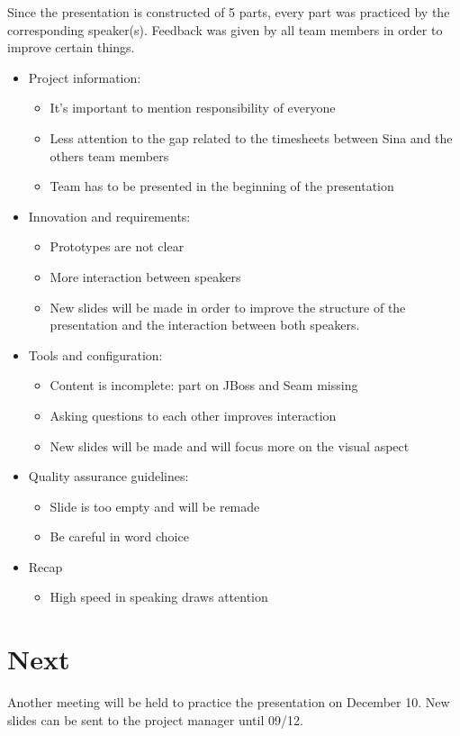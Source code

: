 \documentclass[a4paper, 12pt]{article}
\begin{document}
Since the presentation is constructed of 5 parts, every part was practiced by the corresponding speaker(s). Feedback was given by all team members in order to improve certain things. 

\begin{itemize}
	
	\item Project information:
	\begin{itemize}
		\item It's important to mention responsibility of everyone
		\item Less attention to the gap related to the timesheets between Sina and the others team members 
		\item Team has to be presented in the beginning of the presentation
	\end{itemize}
	
	\item Innovation and requirements:
	\begin{itemize}
		\item Prototypes are not clear
		\item More interaction between speakers
		\item New slides will be made in order to improve the structure of the presentation and the interaction between both speakers. 
	\end{itemize}
	
	\item Tools and configuration:
	\begin{itemize}
		\item Content is incomplete: part on JBoss and Seam missing
		\item Asking questions to each other improves interaction
		\item New slides will be made and will focus more on the visual aspect
	\end{itemize}
	
	\item Quality assurance guidelines:
	\begin{itemize}
		\item Slide is too empty and will be remade
		\item Be careful in word choice
	\end{itemize}
	
	\item Recap
	\begin{itemize}
		\item High speed in speaking draws attention
	\end{itemize}
	
\end{itemize}


\section{Next}

Another meeting will be held to practice the presentation on December 10. New slides can be sent to the project manager until 09/12. 
\end{document}
